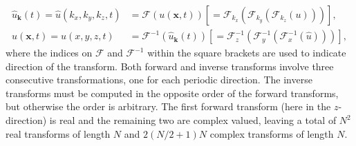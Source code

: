 \documentclass[11pt, oneside]{article}
\begin{document}
\begin{align}
\hat{u}_{\bm{k}}(t) = \hat{{u}}(k_x, k_y, k_z, t) &= \mathcal{F}({u}(\bm{x}, t)) \left[= \mathcal{F}_{k_x} \left(\mathcal{F}_{k_y} \left( \mathcal{F}_{k_z} ({u}) \right) \right) \right], \label{eq:fft}\\
{u}(\bm{x}, t) = {u}(x, y, z, t) &= \mathcal{F}^{-1}(\hat{{u}}_{\bm{k}}(t)) \left[= \mathcal{F}^{-1}_{z}\left(\mathcal{F}^{-1}_{y}\left(\mathcal{F}^{-1}_{x}(\hat{{u}})\right)\right)\right], \label{eq:ifft}
\end{align}
where the indices on $\mathcal{F}$ and $\mathcal{F}^{-1}$ within the square brackets are used to indicate direction of the transform. Both forward and inverse transforms involve three consecutive transformations, one for each periodic direction. The inverse transforms must be computed in the opposite order of the forward transforms, but otherwise the order is arbitrary. The first forward transform (here in the $z$-direction) is real and the remaining two are complex valued, leaving a total of $N^2$ real transforms of length $N$ and $2(N/2+1)N$ complex transforms of length $N$.

\end{document}
